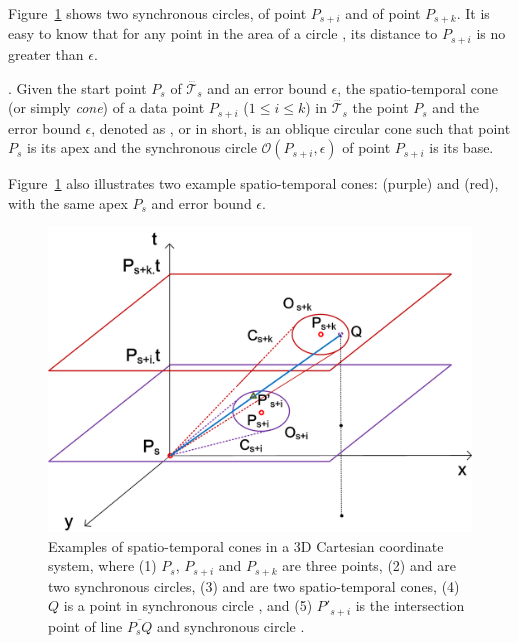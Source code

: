 Figure~\ref{fig:cis} shows two synchronous circles,  of point $P_{s+i}$ and  of point $P_{s+k}$.
It is easy to know that for any point in the area of a circle , its distance to $P_{s+i}$ is no greater than $\epsilon$.





. Given the start point $P_s$ of $\dddot{\mathcal{T}_s}$ and an error bound $\epsilon$, the spatio-temporal cone (or simply \textit{cone}) of a data point $P_{s+i}$ ($1\le i\le k$) in $\dddot{\mathcal{T}_s}$ \wrt the point $P_s$ and the error bound $\epsilon$, denoted as , or  in short, is an oblique circular cone such that point $P_s$ is its apex and the synchronous circle $\mathcal{O}(P_{s+i}, \epsilon)$ of point $P_{s+i}$ is its base.

Figure~\ref{fig:cis} also illustrates two example spatio-temporal cones:  {(purple)} and  (red), with the same apex $P_s$ and error bound $\epsilon$.



\begin{figure}[tb!]
	\centering
	\includegraphics[scale=0.66]{figures/Fig-CIS.png}
	\caption{\small Examples of spatio-temporal cones in a 3D Cartesian coordinate system, where (1) $P_s$, $P_{s+i}$ and $P_{s+k}$ are three points, (2)  and  are two synchronous circles, (3)  and  are two spatio-temporal cones, (4) $Q$ is a point in synchronous circle , and (5) $P'_{s+i}$ is the intersection point of line $\overline{P_sQ}$ and synchronous circle .}
	\label{fig:cis}
\end{figure}

